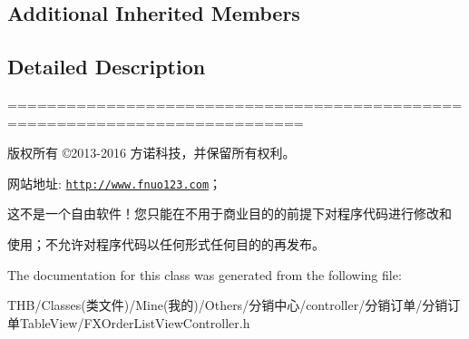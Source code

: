 \subsection*{Additional Inherited Members}


\subsection{Detailed Description}
============================================================================

版权所有 ©2013-\/2016 方诺科技，并保留所有权利。

网站地址\+: \href{http://www.fnuo123.com}{\tt http\+://www.\+fnuo123.\+com}； 



这不是一个自由软件！您只能在不用于商业目的的前提下对程序代码进行修改和

使用；不允许对程序代码以任何形式任何目的的再发布。 

 

The documentation for this class was generated from the following file\+:\begin{DoxyCompactItemize}
\item 
T\+H\+B/\+Classes(类文件)/\+Mine(我的)/\+Others/分销中心/controller/分销订单/分销订单\+Table\+View/F\+X\+Order\+List\+View\+Controller.\+h\end{DoxyCompactItemize}
